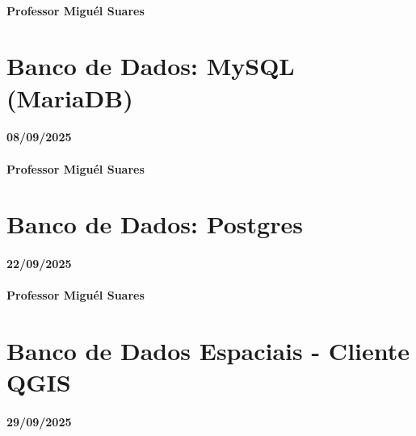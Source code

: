 \documentclass[
]{book}
\begin{document}
\subsubsection*{Professor Miguél Suares}\label{professor-miguuxe9l-suares-4}

\chapter{Banco de Dados: MySQL (MariaDB)}\label{banco-de-dados-mysql-mariadb}

\subsubsection*{08/09/2025}\label{section-5}

\subsubsection*{Professor Miguél Suares}\label{professor-miguuxe9l-suares-5}

\chapter{Banco de Dados: Postgres}\label{banco-de-dados-postgres}

\subsubsection*{22/09/2025}\label{section-6}

\subsubsection*{Professor Miguél Suares}\label{professor-miguuxe9l-suares-6}

\chapter{Banco de Dados Espaciais - Cliente QGIS}\label{banco-de-dados-espaciais---cliente-qgis}

\subsubsection*{29/09/2025}\label{section-7}
\end{document}
